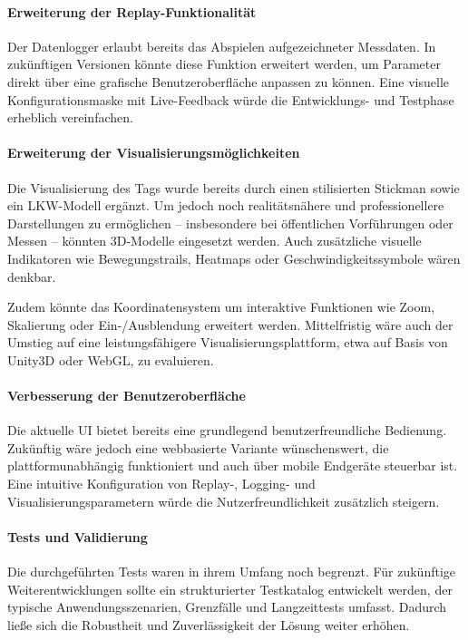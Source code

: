 \documentclass[a4paper, 12pt]{article} %
\begin{document}
\paragraph{Erweiterung der Replay-Funktionalität}
Der Datenlogger erlaubt bereits das Abspielen aufgezeichneter Messdaten. In zukünftigen Versionen könnte diese Funktion erweitert werden, um Parameter 
direkt über eine grafische Benutzeroberfläche anpassen zu können. Eine visuelle Konfigurationsmaske mit Live-Feedback würde die Entwicklungs- und 
Testphase erheblich vereinfachen.

\paragraph{Erweiterung der Visualisierungsmöglichkeiten}
Die Visualisierung des Tags wurde bereits durch einen stilisierten Stickman sowie ein \ac{LKW}-Modell ergänzt. Um jedoch noch realitätsnähere und
professionellere Darstellungen zu ermöglichen – insbesondere bei öffentlichen Vorführungen oder Messen – könnten 3D-Modelle eingesetzt werden. 
Auch zusätzliche visuelle Indikatoren wie Bewegungstrails, Heatmaps oder Geschwindigkeitssymbole wären denkbar.

Zudem könnte das Koordinatensystem um interaktive Funktionen wie Zoom, Skalierung oder Ein-/Ausblendung erweitert werden. Mittelfristig wäre auch 
der Umstieg auf eine leistungsfähigere Visualisierungsplattform, etwa auf Basis von Unity3D oder WebGL, zu evaluieren.

\paragraph{Verbesserung der Benutzeroberfläche}
Die aktuelle \ac{UI} bietet bereits eine grundlegend benutzerfreundliche Bedienung. Zukünftig wäre jedoch eine webbasierte Variante wünschenswert, 
die plattformunabhängig funktioniert und auch über mobile Endgeräte steuerbar ist. Eine intuitive Konfiguration von Replay-, Logging- und 
Visualisierungsparametern würde die Nutzerfreundlichkeit zusätzlich steigern.

\paragraph{Tests und Validierung}
Die durchgeführten Tests waren in ihrem Umfang noch begrenzt. Für zukünftige Weiterentwicklungen sollte ein strukturierter Testkatalog 
entwickelt werden, der typische Anwendungsszenarien, Grenzfälle und Langzeittests umfasst. Dadurch ließe sich die Robustheit und Zuverlässigkeit 
der Lösung weiter erhöhen.
\end{document}
